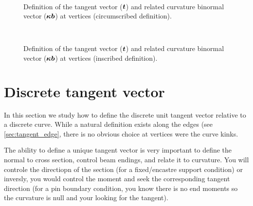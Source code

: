 \begin{figure}[p]
\begin{leftfullpage}
	\captionsetup[subfloat]{captionskip=20pt}
	\centering
	\vspace{-5mm}
	\\
	\hspace{5mm}
	\vspace{8pt}
	\caption{Definition of the tangent vector ($\boldsymbol{t}$) and related curvature binormal vector ($\boldsymbol{\kappa b}$) at vertices (circumscribed definition).}
	\label{fig:kb_vertex_tangent}
\end{leftfullpage}
\end{figure}
\begin{figure}[p]
\begin{fullpage}
	\captionsetup[subfloat]{captionskip=10pt}
	\centering
	\vspace{-5mm}
	\\
	\hspace{5mm}
	\vspace{8pt}
	\caption{Definition of the tangent vector ($\boldsymbol{t}$) and related curvature binormal vector ($\boldsymbol{\kappa b}$) at vertices (inscribed definition).}
	\label{fig:kb_edge_tangent}
\end{fullpage}
\end{figure}

\section{Discrete tangent vector}\label{sec:tangent}

In this section we study how to define the discrete unit tangent vector relative to a discrete curve. While a natural definition exists along the edges (see \cref{sec:tangent_edge}, there is no obvious choice at vertices were the curve kinks.

The ability to define a unique tangent vector is very important to define the normal to cross section, control beam endings, and relate it to curvature.
You will controle the directiopn of the section (for a fixed/encastre support condition) or inversly, you would control the moment and seek the corresponding tangent direction (for a pin boundary condition, you know there is no end moments so the curvature is null and your looking for the tangent).

